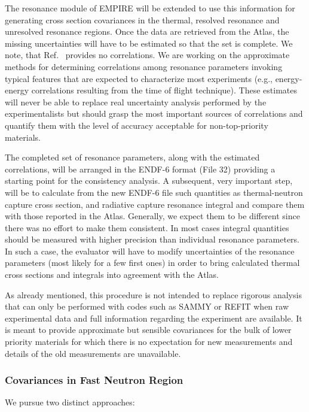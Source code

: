 The resonance module of EMPIRE will be extended to use this information for
generating cross section covariances in the thermal, resolved resonance and
unresolved resonance regions. Once the data are retrieved from the Atlas,
the missing uncertainties will have to be estimated so that the set is
complete. We note, that Ref.~\cite{Mughabghab:06} provides no correlations.
We are working on the approximate methods for determining correlations among
resonance parameters invoking typical features that are expected to
characterize most experiments (e.g., energy-energy correlations resulting
from the time of flight technique). These estimates will never be able to
replace real uncertainty analysis performed by the experimentalists but
should grasp the most important sources of correlations and quantify them
with the level of accuracy acceptable for non-top-priority materials.

The completed set of resonance parameters, along with the estimated
correlations, will be arranged in the ENDF-6 format (File 32) providing a
starting point for the consistency analysis. A subsequent, very important
step, will be to calculate from the new ENDF-6 file such quantities as
thermal-neutron capture cross section, and radiative capture resonance
integral and compare them with those reported in the Atlas. Generally, we
expect them to be different since there was no effort to make them
consistent. In most cases integral quantities should be measured with higher
precision than individual resonance parameters. In such a case, the
evaluator will have to modify uncertainties of the resonance parameters
(most likely for a few first ones) in order to bring calculated thermal
cross sections and integrals into agreement with the Atlas.

As already mentioned, this procedure is not intended to replace rigorous
analysis that can only be performed with codes such as SAMMY or REFIT when
raw experimental data and full information regarding the experiment are
available. It is meant to provide approximate but sensible covariances for
the bulk of lower priority materials for which there is no expectation for
new measurements and details of the old measurements are unavailable.

\subsubsection{Covariances in Fast Neutron Region}

We pursue two distinct approaches:

